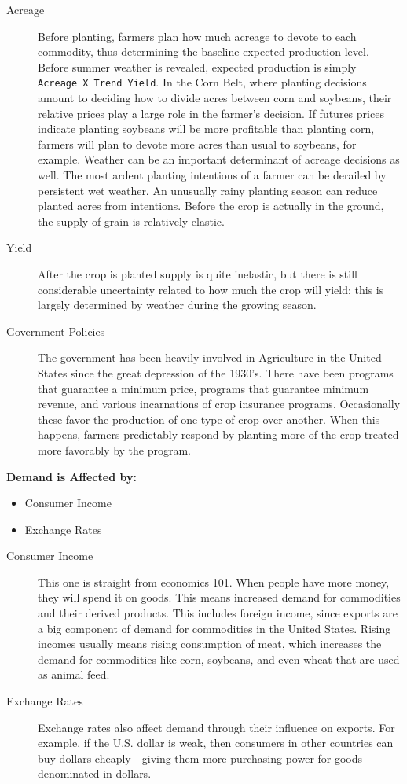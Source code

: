 \documentclass[
  letterpaper,
  DIV=11,
  numbers=noendperiod]{scrreprt}
\providecommand{\tightlist}{%
  \setlength{\itemsep}{0pt}\setlength{\parskip}{0pt}}\usepackage{longtable,booktabs,array}
\begin{document}
\begin{description}
\item[Acreage]
Before planting, farmers plan how much acreage to devote to each
commodity, thus determining the baseline expected production level.
Before summer weather is revealed, expected production is simply
\texttt{Acreage\ X\ Trend\ Yield}. In the Corn Belt, where planting
decisions amount to deciding how to divide acres between corn and
soybeans, their relative prices play a large role in the farmer's
decision. If futures prices indicate planting soybeans will be more
profitable than planting corn, farmers will plan to devote more acres
than usual to soybeans, for example. Weather can be an important
determinant of acreage decisions as well. The most ardent planting
intentions of a farmer can be derailed by persistent wet weather. An
unusually rainy planting season can reduce planted acres from
intentions. Before the crop is actually in the ground, the supply of
grain is relatively elastic.
\item[Yield]
After the crop is planted supply is quite inelastic, but there is still
considerable uncertainty related to how much the crop will yield; this
is largely determined by weather during the growing season.
\item[Government Policies]
The government has been heavily involved in Agriculture in the United
States since the great depression of the 1930's. There have been
programs that guarantee a minimum price, programs that guarantee minimum
revenue, and various incarnations of crop insurance programs.
Occasionally these favor the production of one type of crop over
another. When this happens, farmers predictably respond by planting more
of the crop treated more favorably by the program.
\end{description}

\textbf{Demand is Affected by:}

\begin{itemize}
\tightlist
\item
  Consumer Income
\item
  Exchange Rates
\end{itemize}

\begin{description}
\item[Consumer Income]
This one is straight from economics 101. When people have more money,
they will spend it on goods. This means increased demand for commodities
and their derived products. This includes foreign income, since exports
are a big component of demand for commodities in the United States.
Rising incomes usually means rising consumption of meat, which increases
the demand for commodities like corn, soybeans, and even wheat that are
used as animal feed.
\item[Exchange Rates]
Exchange rates also affect demand through their influence on exports.
For example, if the U.S. dollar is weak, then consumers in other
countries can buy dollars cheaply - giving them more purchasing power
for goods denominated in dollars.
\end{description}
\end{document}
